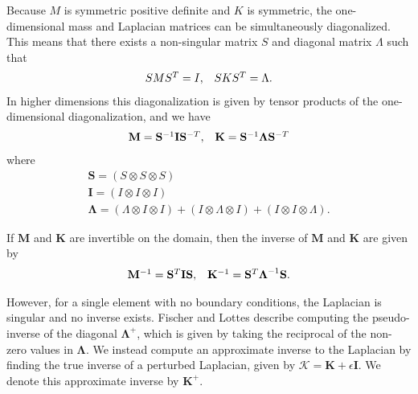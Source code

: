 Because $M$ is symmetric positive definite and $K$ is symmetric, the one-dimensional mass and Laplacian matrices can be simultaneously diagonalized.
This means that there exists a non-singular matrix $S$ and diagonal matrix $\Lambda$ such that
\begin{equation}
\begin{array}{c c}
S M S^T = I,  &  S K S^T = \Lambda.
\end{array}
\end{equation}
In higher dimensions this diagonalization is given by tensor products of the one-dimensional diagonalization, and we have
\begin{equation}
\begin{array}{c c}
\mathbf{M}   = \mathbf{S}^{-1} \mathbf{I} \mathbf{S}^{-T},  &  \mathbf{K} = \mathbf{S}^{-1} \boldsymbol{\Lambda} \mathbf{S}^{-T}  \\
\end{array}
\end{equation}
where
\begin{equation}
\begin{array}{c}
\mathbf{S}       = \left( S \otimes S \otimes S \right)  \\
\mathbf{I}       = \left( I \otimes I \otimes I \right)  \\
\boldsymbol{\Lambda} = \left( \Lambda \otimes I \otimes I \right) + \left( I \otimes \Lambda \otimes I \right) + \left( I \otimes I \otimes \Lambda \right).
\end{array}
\end{equation}

If $\mathbf{M}$ and $\mathbf{K}$ are invertible on the domain, then the inverse of $\mathbf{M}$ and $\mathbf{K}$ are given by
\begin{equation}
\begin{array}{c c}
\mathbf{M}^{-1} = \mathbf{S}^T \mathbf{I} \mathbf{S},  &  \mathbf{K}^{-1} = \mathbf{S}^T \boldsymbol{\Lambda}^{-1} \mathbf{S}.
\end{array}
\end{equation}

However, for a single element with no boundary conditions, the Laplacian is singular and no inverse exists.
Fischer and Lottes \cite{fischer2005hybrid} describe computing the pseudo-inverse of the diagonal $\boldsymbol{\Lambda}^{+}$, which is given by taking the reciprocal of the non-zero values in $\boldsymbol{\Lambda}$.
We instead compute an approximate inverse to the Laplacian by finding the true inverse of a perturbed Laplacian, given by $\boldsymbol{\mathcal{K}} = \mathbf{K} + \epsilon \mathbf{I}$.
We denote this approximate inverse by $\mathbf{K}^+$.

